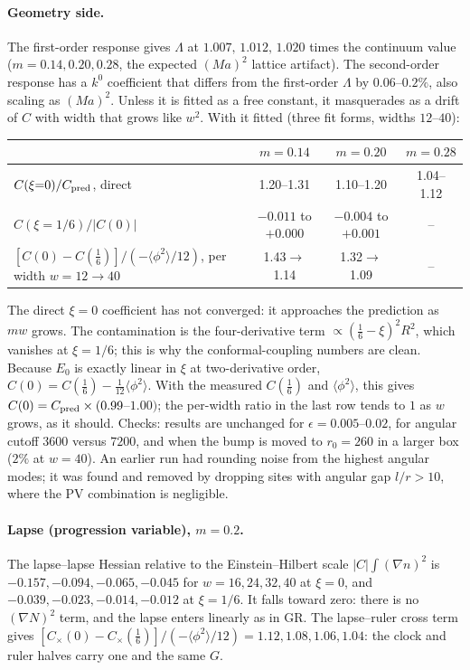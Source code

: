 \documentclass[11pt]{article}
\begin{document}
\paragraph{Geometry side.} The first-order response gives $\Lambda$ at $1.007,\,1.012,\,1.020$ times the continuum value ($m=0.14,0.20,0.28$, the expected $(Ma)^2$ lattice artifact). The second-order response has a $k^0$ coefficient that differs from the first-order $\Lambda$ by $0.06$--$0.2\%$, also scaling as $(Ma)^2$. Unless it is fitted as a free constant, it masquerades as a drift of $C$ with width that grows like $w^2$. With it fitted (three fit forms, widths $12$--$40$):
\begin{center}\small\begin{tabular}{lccc}\toprule
& $m=0.14$ & $m=0.20$ & $m=0.28$\\\midrule
$C(\xi{=}0)/C_{\rm pred}$, direct & 1.20--1.31 & 1.10--1.20 & 1.04--1.12\\
$C(\xi{=}1/6)/|C(0)|$ & $-0.011$ to $+0.000$ & $-0.004$ to $+0.001$ & --\\
$[C(0)-C(\tfrac16)]\big/(-\langle\phi^2\rangle/12)$, per width $w=12\to40$ & 1.43$\to$1.14 & 1.32$\to$1.09 & --\\\bottomrule\end{tabular}\end{center}
The direct $\xi=0$ coefficient has not converged: it approaches the prediction as $m w$ grows. The contamination is the four-derivative term $\propto(\tfrac16-\xi)^2R^2$, which vanishes at $\xi=1/6$; this is why the conformal-coupling numbers are clean. Because $E_0$ is exactly linear in $\xi$ at two-derivative order, $C(0)=C(\tfrac16)-\tfrac1{12}\langle\phi^2\rangle$. With the measured $C(\tfrac16)$ and $\langle\phi^2\rangle$, this gives $C(0)=C_{\rm pred}\times(0.99$--$1.00)$; the per-width ratio in the last row tends to $1$ as $w$ grows, as it should. Checks: results are unchanged for $\epsilon=0.005$--$0.02$, for angular cutoff $3600$ versus $7200$, and when the bump is moved to $r_0=260$ in a larger box ($2\%$ at $w=40$). An earlier run had rounding noise from the highest angular modes; it was found and removed by dropping sites with angular gap $l/r>10$, where the PV combination is negligible.

\paragraph{Lapse (progression variable), $m=0.2$.} The lapse--lapse Hessian relative to the Einstein--Hilbert scale $|C|\int(\nabla n)^2$ is $-0.157,-0.094,-0.065,-0.045$ for $w=16,24,32,40$ at $\xi=0$, and $-0.039,-0.023,-0.014,-0.012$ at $\xi=1/6$. It falls toward zero: there is no $(\nabla N)^2$ term, and the lapse enters linearly as in GR. The lapse--ruler cross term gives $[C_\times(0)-C_\times(\tfrac16)]/(-\langle\phi^2\rangle/12)=1.12,1.08,1.06,1.04$: the clock and ruler halves carry one and the same $G$.
\end{document}
